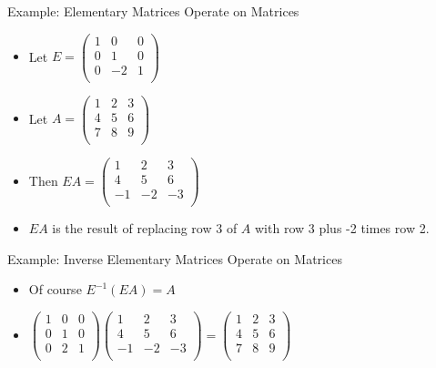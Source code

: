 \documentclass{beamer}
\begin{document}
\begin{frame}{Example: Elementary Matrices Operate on Matrices}

\begin{itemize}
\item Let $E=
\begin{pmatrix}
1 & 0 & 0 \\
0 & 1 & 0 \\
0 & -2 & 1 \\
\end{pmatrix}
$
\item Let $A=
\begin{pmatrix}
1 & 2 & 3 \\
4 & 5 & 6 \\
7 & 8 & 9 \\
\end{pmatrix}
$
\item Then $EA=
\begin{pmatrix}
1 & 2 & 3 \\
4 & 5 & 6 \\
-1 & -2 & -3 \\
\end{pmatrix}
$
\item $EA$ is the result of replacing row 3 of $A$ with row 3 plus -2 times row 2.
\end{itemize}
\end{frame}
\begin{frame}{Example: Inverse Elementary Matrices Operate on Matrices}

\begin{itemize}
\item Of course $E^{-1}\left(EA\right) = A$
\item $
\begin{pmatrix}
1 & 0 & 0 \\
0 & 1 & 0 \\
0 & 2 & 1 \\
\end{pmatrix}
\begin{pmatrix}
1 & 2 & 3 \\
4 & 5 & 6 \\
-1 & -2 & -3 \\
\end{pmatrix}
=
\begin{pmatrix}
1 & 2 & 3 \\
4 & 5 & 6 \\
7 & 8 & 9 \\
\end{pmatrix}
$
\end{itemize}
\end{frame}
\end{document}
